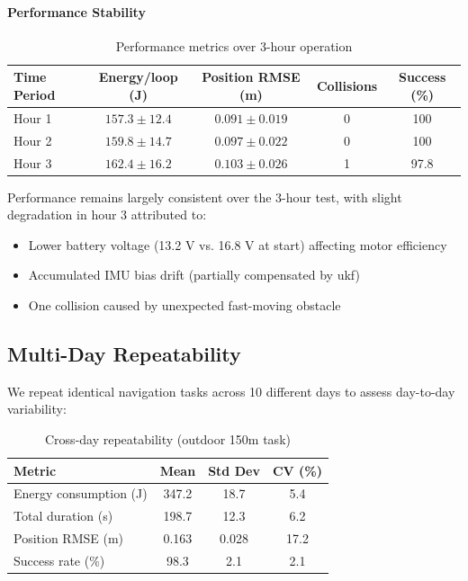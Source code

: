 \paragraph{Performance Stability}
\begin{table}[htbp]
\centering
\caption{Performance metrics over 3-hour operation}
\label{tab:long_duration_performance}
\begin{tabular}{lcccc}
\toprule
\textbf{Time Period} & \textbf{Energy/loop (J)} & \textbf{Position RMSE (m)} & \textbf{Collisions} & \textbf{Success (\%)} \\
\midrule
Hour 1 & $157.3 \pm 12.4$ & $0.091 \pm 0.019$ & 0 & 100 \\
Hour 2 & $159.8 \pm 14.7$ & $0.097 \pm 0.022$ & 0 & 100 \\
Hour 3 & $162.4 \pm 16.2$ & $0.103 \pm 0.026$ & 1 & 97.8 \\
\bottomrule
\end{tabular}
\end{table}

Performance remains largely consistent over the 3-hour test, with slight degradation in hour 3 attributed to:
\begin{itemize}
    \item Lower battery voltage (13.2 V vs. 16.8 V at start) affecting motor efficiency
    \item Accumulated IMU bias drift (partially compensated by \acrshort{ukf})
    \item One collision caused by unexpected fast-moving obstacle
\end{itemize}


\subsection{Multi-Day Repeatability}

We repeat identical navigation tasks across 10 different days to assess day-to-day variability:

\begin{table}[htbp]
\centering
\caption{Cross-day repeatability (outdoor 150m task)}
\label{tab:multi_day_repeatability}
\begin{tabular}{lccc}
\toprule
\textbf{Metric} & \textbf{Mean} & \textbf{Std Dev} & \textbf{CV (\%)} \\
\midrule
Energy consumption (J) & 347.2 & 18.7 & 5.4 \\
Total duration (s) & 198.7 & 12.3 & 6.2 \\
Position RMSE (m) & 0.163 & 0.028 & 17.2 \\
Success rate (\%) & 98.3 & 2.1 & 2.1 \\
\bottomrule
\end{tabular}
\end{table}

